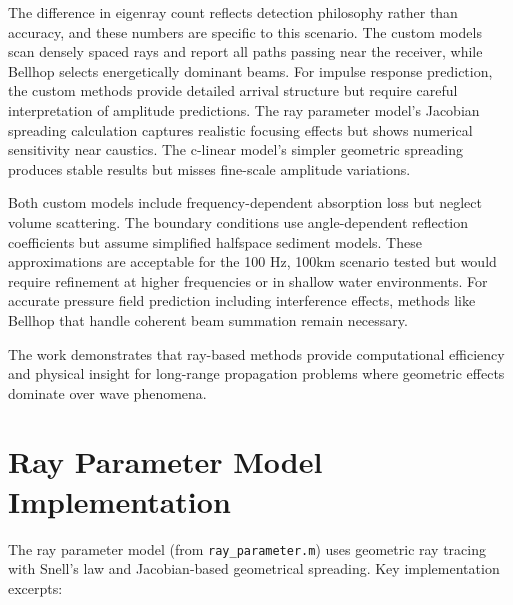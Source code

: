 \documentclass[fleqn]{jaes}
\begin{document}
The difference in eigenray count reflects detection philosophy rather than accuracy, and these numbers are specific to this scenario. The custom models scan densely spaced rays and report all paths passing near the receiver, while Bellhop selects energetically dominant beams. For impulse response prediction, the custom methods provide detailed arrival structure but require careful interpretation of amplitude predictions. The ray parameter model's Jacobian spreading calculation captures realistic focusing effects but shows numerical sensitivity near caustics. The c-linear model's simpler geometric spreading produces stable results but misses fine-scale amplitude variations.

Both custom models include frequency-dependent absorption loss but neglect volume scattering. The boundary conditions use angle-dependent reflection coefficients but assume simplified halfspace sediment models. These approximations are acceptable for the 100 Hz, 100km scenario tested but would require refinement at higher frequencies or in shallow water environments. For accurate pressure field prediction including interference effects, methods like Bellhop that handle coherent beam summation remain necessary.

The work demonstrates that ray-based methods provide computational efficiency and physical insight for long-range propagation problems where geometric effects dominate over wave phenomena.




\appendix

\section{Ray Parameter Model Implementation}

The ray parameter model (from \texttt{ray\_parameter.m}) uses geometric ray tracing with Snell's law and Jacobian-based geometrical spreading. Key implementation excerpts:
\end{document}
